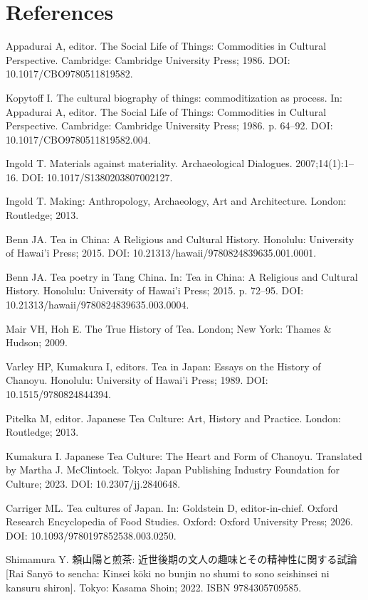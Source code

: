 \documentclass[11pt,a4paper]{article}
\newenvironment{refs}{%
  \begin{list}{}{%
    \setlength{\leftmargin}{1.6em}
    \setlength{\itemindent}{-1.6em}
    \setlength{\itemsep}{0.6em}
    \setlength{\parsep}{0pt}
  }
}{\end{list}}
\newcommand{\refitem}[2]{\item[] [#1] #2}
\begin{document}
\section*{References}
\begin{refs}

\refitem{1}{Appadurai A, editor. The Social Life of Things: Commodities in Cultural Perspective. Cambridge: Cambridge University Press; 1986. DOI: 10.1017/CBO9780511819582.}

\refitem{2}{Kopytoff I. The cultural biography of things: commoditization as process. In: Appadurai A, editor. The Social Life of Things: Commodities in Cultural Perspective. Cambridge: Cambridge University Press; 1986. p. 64--92. DOI: 10.1017/CBO9780511819582.004.}

\refitem{3}{Ingold T. Materials against materiality. Archaeological Dialogues. 2007;14(1):1--16. DOI: 10.1017/S1380203807002127.}

\refitem{4}{Ingold T. Making: Anthropology, Archaeology, Art and Architecture. London: Routledge; 2013.}

\refitem{5}{Benn JA. Tea in China: A Religious and Cultural History. Honolulu: University of Hawai'i Press; 2015. DOI: 10.21313/hawaii/9780824839635.001.0001.}

\refitem{6}{Benn JA. Tea poetry in Tang China. In: Tea in China: A Religious and Cultural History. Honolulu: University of Hawai'i Press; 2015. p. 72--95. DOI: 10.21313/hawaii/9780824839635.003.0004.}

\refitem{7}{Mair VH, Hoh E. The True History of Tea. London; New York: Thames \& Hudson; 2009.}

\refitem{8}{Varley HP, Kumakura I, editors. Tea in Japan: Essays on the History of Chanoyu. Honolulu: University of Hawai'i Press; 1989. DOI: 10.1515/9780824844394.}

\refitem{9}{Pitelka M, editor. Japanese Tea Culture: Art, History and Practice. London: Routledge; 2013.}

\refitem{10}{Kumakura I. Japanese Tea Culture: The Heart and Form of Chanoyu. Translated by Martha J. McClintock. Tokyo: Japan Publishing Industry Foundation for Culture; 2023. DOI: 10.2307/jj.2840648.}

\refitem{11}{Carriger ML. Tea cultures of Japan. In: Goldstein D, editor-in-chief. Oxford Research Encyclopedia of Food Studies. Oxford: Oxford University Press; 2026. DOI: 10.1093/9780197852538.003.0250.}

\refitem{12}{Shimamura Y. 頼山陽と煎茶: 近世後期の文人の趣味とその精神性に関する試論 [Rai Sanyō to sencha: Kinsei kōki no bunjin no shumi to sono seishinsei ni kansuru shiron]. Tokyo: Kasama Shoin; 2022. ISBN 9784305709585.}


\end{refs}
\end{document}
